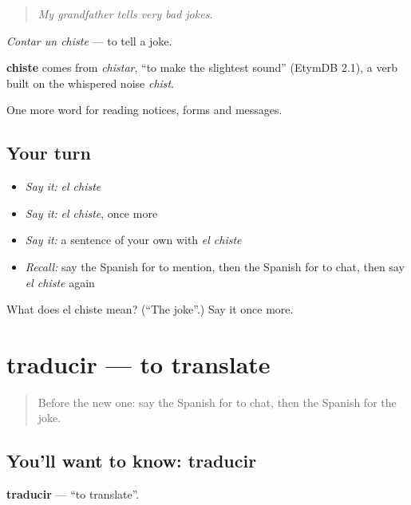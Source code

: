 \begin{quote}
\emph{My grandfather tells very bad jokes.}
\end{quote}

\emph{Contar un chiste} — to tell a joke.

\begin{cousinweb}
\textbf{chiste} comes from \emph{chistar}, \textquotedblleft{}to make the slightest sound\textquotedblright{} (EtymDB 2.1), a verb built on the whispered noise \emph{chist}.
\end{cousinweb}

\begin{grammarlens}[title={What you've built}]
One more word for reading notices, forms and messages.
\end{grammarlens}

\subsection*{Your turn}
\begin{itemize}
\raggedright
  \item \emph{Say it:} \emph{el chiste}
  \item \emph{Say it:} \emph{el chiste}, once more
  \item \emph{Say it:} a sentence of your own with \emph{el chiste}
  \item \emph{Recall:} say the Spanish for to mention, then the Spanish for to chat, then say \emph{el chiste} again
\end{itemize}

\begin{tcolorbox}[breakable,colback=teal!4,colframe=teal!35!black,title={Before you move on}]
What does el chiste mean? (\textquotedblleft{}The joke\textquotedblright{}.) Say it once more.
\end{tcolorbox}
\section[traducir]{traducir — to translate}

\label{lesson:ES-C502-traducir}



\begin{quote}
Before the new one: say the Spanish for to chat, then the Spanish for the joke.
\end{quote}

\subsection*{You'll want to know: traducir}
\textbf{traducir} — \textquotedblleft{}to translate\textquotedblright{}.

